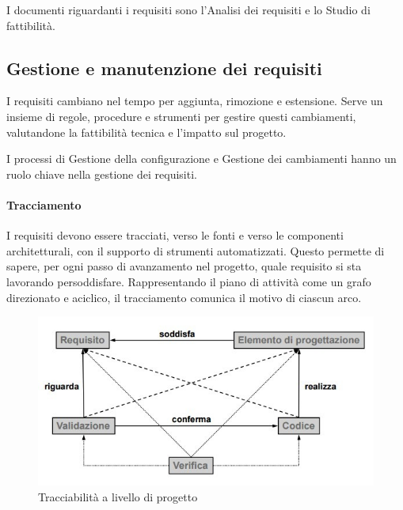 I documenti riguardanti i requisiti sono l'Analisi dei requisiti e lo Studio
di fattibilità.

\subsection{Gestione e manutenzione dei requisiti}
\label{ssub:gestione_e_manutenzione_dei_prodotti}

I requisiti cambiano nel tempo per aggiunta, rimozione e estensione. Serve un
insieme di regole, procedure e strumenti per gestire questi cambiamenti,
valutandone la fattibilità tecnica e l'impatto sul progetto.

I processi di Gestione della configurazione e Gestione dei cambiamenti hanno un
ruolo chiave nella gestione dei requisiti.

\paragraph{Tracciamento}
\label{par:tracciamento}

I requisiti devono essere tracciati, verso le fonti e verso le componenti
architetturali, con il supporto di strumenti automatizzati. Questo permette di
sapere, per ogni passo di avanzamento nel progetto, quale requisito si sta
lavorando persoddisfare. Rappresentando il piano di attività come un grafo
direzionato e aciclico, il tracciamento comunica il motivo di ciascun arco.

\begin{figure}[h!]
  \centering
  \includegraphics[scale=0.5]{imgs/traceability}
  \caption{Tracciabilità a livello di progetto}
\end{figure}


